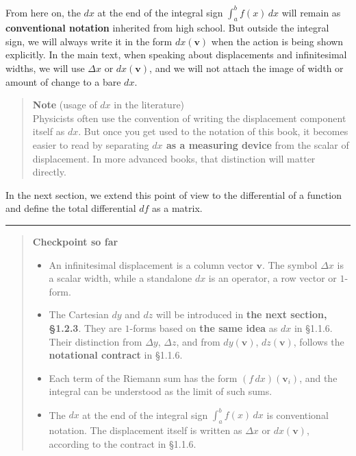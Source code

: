 From here on, the \(dx\) at the end of the integral sign
\(\int_a^b f(x)\,dx\) will remain as \textbf{conventional notation}
inherited from high school. But outside the integral sign, we will
always write it in the form \(dx(\mathbf{v})\) when the action is being
shown explicitly. In the main text, when speaking about displacements
and infinitesimal widths, we will use \(\Delta x\) or
\(dx(\mathbf{v})\), and we will not attach the image of width or amount
of change to a bare \(dx\).

\begin{quote}
\textbf{Note} (usage of \(dx\) in the literature)\\
Physicists often use the convention of writing the displacement
component itself as \(dx\). But once you get used to the notation of
this book, it becomes easier to read by separating
\textbf{$dx$ as a measuring device} from the scalar of displacement. In
more advanced books, that distinction will matter directly.
\end{quote}

In the next section, we extend this point of view to the differential of
a function and define the total differential \(df\) as a matrix.

\begin{center}\rule{0.5\linewidth}{0.5pt}\end{center}

\begin{quote}
\textbf{Checkpoint so far}

\begin{itemize}
\item
  An infinitesimal displacement is a column vector \(\mathbf{v}\). The
  symbol \(\Delta x\) is a scalar width, while a standalone \(dx\) is an
  operator, a row vector or \(1\)-form.
\item
  The Cartesian \(dy\) and \(dz\) will be introduced in
  \textbf{the next section, §1.2.3}. They are \(1\)-forms based on
  \textbf{the same idea} as \(dx\) in §1.1.6. Their distinction from
  \(\Delta y\), \(\Delta z\), and from \(dy(\mathbf{v})\),
  \(dz(\mathbf{v})\), follows the \textbf{notational contract} in
  §1.1.6.
\item
  Each term of the Riemann sum has the form \((f\,dx)(\mathbf{v}_i)\),
  and the integral can be understood as the limit of such sums.
\item
  The \(dx\) at the end of the integral sign \(\int_a^b f(x)\,dx\) is
  conventional notation. The displacement itself is written as
  \(\Delta x\) or \(dx(\mathbf{v})\), according to the contract in
  §1.1.6.
\end{itemize}
\end{quote}

